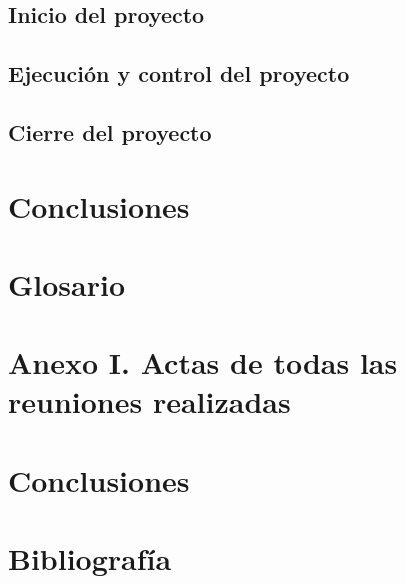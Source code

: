 \documentclass{article}
\begin{document}
\subsection{Inicio del proyecto}

\subsection{Ejecución y control del proyecto}

\subsection{Cierre del proyecto}

\section{Conclusiones}

\section*{Glosario}

\section*{Anexo I. Actas de todas las reuniones realizadas}

\section{Conclusiones}

\section{Bibliografía}
\end{document}
